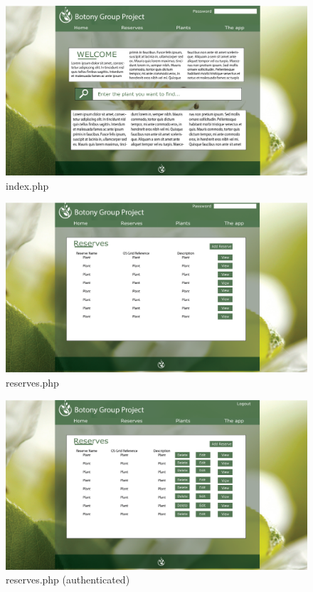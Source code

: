         \begin{landscape}
            \begin{figure}
                \centering
                \includegraphics[scale=0.4]{uiDesign/uiwebimages/index.png}
                \caption{index.php}
                \label{fig:indexWebpage}
            \end{figure}

        
            \begin{figure}
                \centering
                \includegraphics[scale=0.4]{uiDesign/uiwebimages/reserves.png}
                \caption{reserves.php}
                \label{fig:reserves}
            \end{figure}

        
            \begin{figure}
                \centering
                \includegraphics[scale=0.4]{uiDesign/uiwebimages/reserveslogged.png}
                \caption{reserves.php (authenticated)}
                \label{fig:reservesLogged}
            \end{figure}


\end{landscape}
